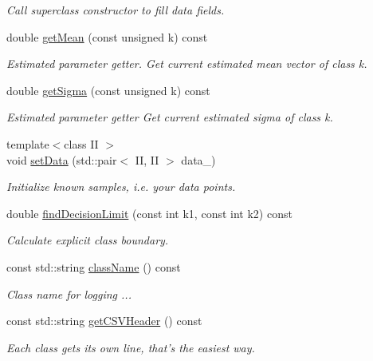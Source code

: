 \begin{DoxyCompactItemize}
\begin{DoxyCompactList}\small\item\em Call superclass constructor to fill data fields. \item\end{DoxyCompactList}\item 
double \hyperlink{classCDA_1_1GaussianMixtureModel1D_abd992452517cd8f0efc8f5408f898e33}{getMean} (const unsigned k) const 
\begin{DoxyCompactList}\small\item\em Estimated parameter getter. Get current estimated mean vector of class k. \item\end{DoxyCompactList}\item 
double \hyperlink{classCDA_1_1GaussianMixtureModel1D_aa943f4410a27db1d9530b7c63e45b90b}{getSigma} (const unsigned k) const 
\begin{DoxyCompactList}\small\item\em Estimated parameter getter Get current estimated sigma of class k. \item\end{DoxyCompactList}\item 
{\footnotesize template$<$class II $>$ }\\void \hyperlink{classCDA_1_1GaussianMixtureModel1D_ada5a646f31d12697bc0fc66934a54dab}{setData} (std::pair$<$ II, II $>$ data\_\-)
\begin{DoxyCompactList}\small\item\em Initialize known samples, i.e. your data points. \item\end{DoxyCompactList}\item 
double \hyperlink{classCDA_1_1GaussianMixtureModel1D_a411b503fbf704d85df8446c667aa9012}{findDecisionLimit} (const int k1, const int k2) const 
\begin{DoxyCompactList}\small\item\em Calculate explicit class boundary. \item\end{DoxyCompactList}\item 
\hypertarget{classCDA_1_1GaussianMixtureModel1D_a08a734c5b74bccda43429df49db58edf}{
const std::string \hyperlink{classCDA_1_1GaussianMixtureModel1D_a08a734c5b74bccda43429df49db58edf}{className} () const }
\label{classCDA_1_1GaussianMixtureModel1D_a08a734c5b74bccda43429df49db58edf}

\begin{DoxyCompactList}\small\item\em Class name for logging ... \item\end{DoxyCompactList}\item 
const std::string \hyperlink{classCDA_1_1GaussianMixtureModel1D_adfb929641e967030e9b63c6e53ea64c0}{getCSVHeader} () const 
\begin{DoxyCompactList}\small\item\em Each class gets its own line, that's the easiest way. \item\end{DoxyCompactList}\end{DoxyCompactItemize}
